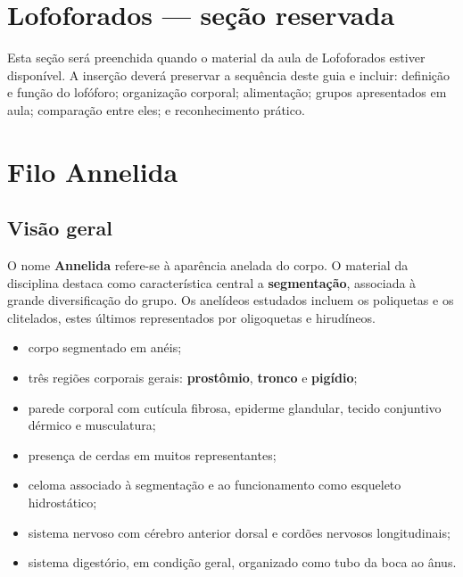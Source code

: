 \documentclass[a4paper,12pt]{article}
\newcommand{\termo}[1]{\textbf{#1}}
\begin{document}
\section{Lofoforados — seção reservada}

\begin{tcolorbox}[breakable,colback=gray!6,colframe=gray!50,title={Conteúdo a incorporar}]
Esta seção será preenchida quando o material da aula de Lofoforados estiver disponível. A inserção deverá preservar a sequência deste guia e incluir: definição e função do lofóforo; organização corporal; alimentação; grupos apresentados em aula; comparação entre eles; e reconhecimento prático.
\end{tcolorbox}

\newpage

\section{Filo Annelida}

\subsection{Visão geral}

O nome \termo{Annelida} refere-se à aparência anelada do corpo. O material da disciplina destaca como característica central a \termo{segmentação}, associada à grande diversificação do grupo. Os anelídeos estudados incluem os poliquetas e os clitelados, estes últimos representados por oligoquetas e hirudíneos.

\begin{itemize}
  \item corpo segmentado em anéis;
  \item três regiões corporais gerais: \termo{prostômio}, \termo{tronco} e \termo{pigídio};
  \item parede corporal com cutícula fibrosa, epiderme glandular, tecido conjuntivo dérmico e musculatura;
  \item presença de cerdas em muitos representantes;
  \item celoma associado à segmentação e ao funcionamento como esqueleto hidrostático;
  \item sistema nervoso com cérebro anterior dorsal e cordões nervosos longitudinais;
  \item sistema digestório, em condição geral, organizado como tubo da boca ao ânus.
\end{itemize}
\end{document}
